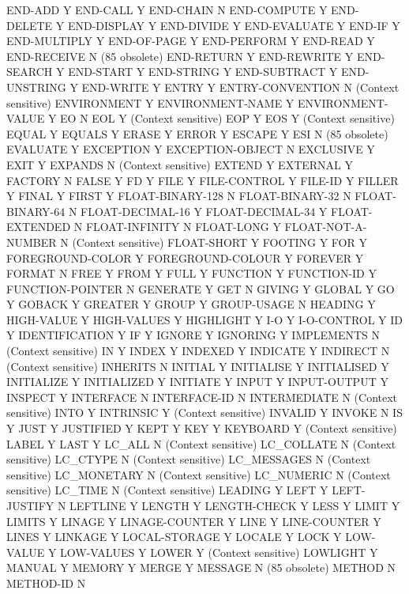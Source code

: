 END-ADD				Y
END-CALL			Y
END-CHAIN			N
END-COMPUTE			Y
END-DELETE			Y
END-DISPLAY			Y
END-DIVIDE			Y
END-EVALUATE			Y
END-IF				Y
END-MULTIPLY			Y
END-OF-PAGE			Y
END-PERFORM			Y
END-READ			Y
END-RECEIVE			N (85 obsolete)
END-RETURN			Y
END-REWRITE			Y
END-SEARCH			Y
END-START			Y
END-STRING			Y
END-SUBTRACT			Y
END-UNSTRING			Y
END-WRITE			Y
ENTRY				Y
ENTRY-CONVENTION		N (Context sensitive)
ENVIRONMENT			Y
ENVIRONMENT-NAME		Y
ENVIRONMENT-VALUE		Y
EO				N
EOL				Y (Context sensitive)
EOP				Y
EOS				Y (Context sensitive)
EQUAL				Y
EQUALS				Y
ERASE				Y
ERROR				Y
ESCAPE				Y
ESI				N (85 obsolete)
EVALUATE			Y
EXCEPTION			Y
EXCEPTION-OBJECT		N
EXCLUSIVE			Y
EXIT				Y
EXPANDS				N (Context sensitive)
EXTEND				Y
EXTERNAL			Y
FACTORY				N
FALSE				Y
FD				Y
FILE				Y
FILE-CONTROL			Y
FILE-ID				Y
FILLER				Y
FINAL				Y
FIRST				Y
FLOAT-BINARY-128		N
FLOAT-BINARY-32			N
FLOAT-BINARY-64			N
FLOAT-DECIMAL-16		Y
FLOAT-DECIMAL-34		Y
FLOAT-EXTENDED			N
FLOAT-INFINITY			N
FLOAT-LONG			Y
FLOAT-NOT-A-NUMBER		N (Context sensitive)
FLOAT-SHORT			Y
FOOTING				Y
FOR				Y
FOREGROUND-COLOR		Y
FOREGROUND-COLOUR		Y
FOREVER				Y
FORMAT				N
FREE				Y
FROM				Y
FULL				Y
FUNCTION			Y
FUNCTION-ID			Y
FUNCTION-POINTER		N
GENERATE			Y
GET				N
GIVING				Y
GLOBAL				Y
GO				Y
GOBACK				Y
GREATER				Y
GROUP				Y
GROUP-USAGE			N
HEADING				Y
HIGH-VALUE			Y
HIGH-VALUES			Y
HIGHLIGHT			Y
I-O				Y
I-O-CONTROL			Y
ID				Y
IDENTIFICATION			Y
IF				Y
IGNORE				Y
IGNORING			Y
IMPLEMENTS			N (Context sensitive)
IN				Y
INDEX				Y
INDEXED				Y
INDICATE			Y
INDIRECT			N (Context sensitive)
INHERITS			N
INITIAL				Y
INITIALISE			Y
INITIALISED			Y
INITIALIZE			Y
INITIALIZED			Y
INITIATE			Y
INPUT				Y
INPUT-OUTPUT			Y
INSPECT				Y
INTERFACE			N
INTERFACE-ID			N
INTERMEDIATE			N (Context sensitive)
INTO				Y
INTRINSIC			Y (Context sensitive)
INVALID				Y
INVOKE				N
IS				Y
JUST				Y
JUSTIFIED			Y
KEPT				Y
KEY				Y
KEYBOARD			Y (Context sensitive)
LABEL				Y
LAST				Y
LC_ALL				N (Context sensitive)
LC_COLLATE			N (Context sensitive)
LC_CTYPE			N (Context sensitive)
LC_MESSAGES			N (Context sensitive)
LC_MONETARY			N (Context sensitive)
LC_NUMERIC			N (Context sensitive)
LC_TIME				N (Context sensitive)
LEADING				Y
LEFT				Y
LEFT-JUSTIFY			N
LEFTLINE			Y
LENGTH				Y
LENGTH-CHECK			Y
LESS				Y
LIMIT				Y
LIMITS				Y
LINAGE				Y
LINAGE-COUNTER			Y
LINE				Y
LINE-COUNTER			Y
LINES				Y
LINKAGE				Y
LOCAL-STORAGE			Y
LOCALE				Y
LOCK				Y
LOW-VALUE			Y
LOW-VALUES			Y
LOWER				Y (Context sensitive)
LOWLIGHT			Y
MANUAL				Y
MEMORY				Y
MERGE				Y
MESSAGE				N (85 obsolete)
METHOD				N
METHOD-ID			N
